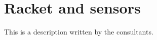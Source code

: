 \chapter{Racket and sensors}\label{appendix:racketSensors}
This is a description written by the consultants.


